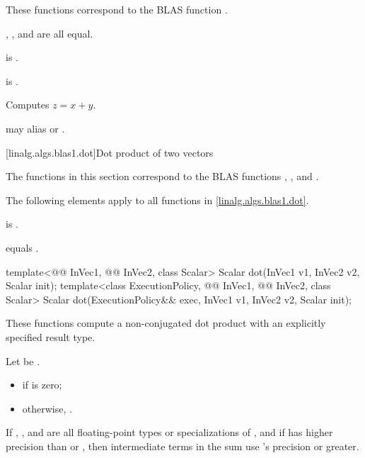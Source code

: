 \begin{itemdescr}
\pnum
\begin{note}
These functions correspond to the BLAS function \supercite{blas1}.
\end{note}

\pnum
\constraints
{}, , and  are all equal.

\pnum
\mandates
{} is .

\pnum
\expects
{} is .

\pnum
\effects
Computes $z = x + y$.

\pnum
\remarks
{} may alias  or .
\end{itemdescr}

[linalg.algs.blas1.dot]{Dot product of two vectors}

\pnum
\begin{note}
The functions in this section correspond to the BLAS
functions , , and \supercite{blas1}.
\end{note}

\pnum
The following elements apply to all functions in \ref{linalg.algs.blas1.dot}.

\pnum
\mandates
{} is .

\pnum
\expects
{} equals .

%
\begin{itemdecl}
template<@@ InVec1, @@ InVec2, class Scalar>
  Scalar dot(InVec1 v1, InVec2 v2, Scalar init);
template<class ExecutionPolicy, @@ InVec1, @@ InVec2, class Scalar>
  Scalar dot(ExecutionPolicy&& exec,
             InVec1 v1, InVec2 v2, Scalar init);
\end{itemdecl}

\begin{itemdescr}
\pnum
These functions compute a non-conjugated dot product
with an explicitly specified result type.

\pnum
\returns
Let  be .
\begin{itemize}
\item
{} if  is zero;
\item
otherwise,
.
\end{itemize}

\pnum
\remarks
If , , and 
are all floating-point types or specializations of ,
and if  has higher precision
than  or ,
then intermediate terms in the sum use 's precision or greater.
\end{itemdescr}

